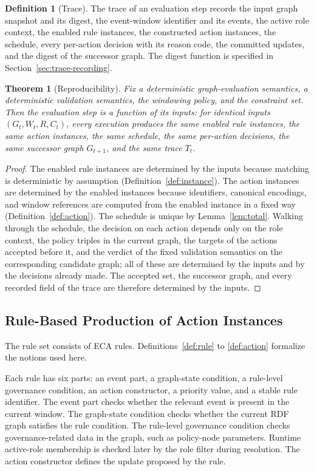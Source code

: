 \documentclass{ieeeaccess}
\theoremstyle{definition}
\newtheorem{definition}{Definition}
\theoremstyle{plain}
\newtheorem{theorem}{Theorem}
\theoremstyle{remark}
\begin{document}
\begin{definition}[Trace]
\label{def:trace}
The trace of an evaluation step records the input graph snapshot and its digest, the event-window identifier and its events, the active role context, the enabled rule instances, the constructed action instances, the schedule, every per-action decision with its reason code, the committed updates, and the digest of the successor graph. The digest function is specified in Section~\ref{sec:trace-recording}.
\end{definition}

\begin{theorem}[Reproducibility]
\label{thm:repro}
Fix a deterministic graph-evaluation semantics, a deterministic validation semantics, the windowing policy, and the constraint set. Then the evaluation step is a function of its inputs: for identical inputs $(G_t, W_t, R, C_t)$, every execution produces the same enabled rule instances, the same action instances, the same schedule, the same per-action decisions, the same successor graph $G_{t+1}$, and the same trace $T_t$.
\end{theorem}
\begin{proof}
The enabled rule instances are determined by the inputs because matching is deterministic by assumption (Definition~\ref{def:instance}). The action instances are determined by the enabled instances because identifiers, canonical encodings, and window references are computed from the enabled instance in a fixed way (Definition~\ref{def:action}). The schedule is unique by Lemma~\ref{lem:total}. Walking through the schedule, the decision on each action depends only on the role context, the policy triples in the current graph, the targets of the actions accepted before it, and the verdict of the fixed validation semantics on the corresponding candidate graph; all of these are determined by the inputs and by the decisions already made. The accepted set, the successor graph, and every recorded field of the trace are therefore determined by the inputs.
\end{proof}

\subsection{Rule-Based Production of Action Instances}

The rule set consists of ECA rules.
Definitions~\ref{def:rule} to \ref{def:action} formalize the notions used here.

Each rule has six parts: an event part, a graph-state condition, a rule-level governance condition, an action constructor, a priority value, and a stable rule identifier. The event part checks whether the relevant event is present in the current window. The graph-state condition checks whether the current RDF graph satisfies the rule condition. The rule-level governance condition checks governance-related data in the graph, such as policy-node parameters. Runtime active-role membership is checked later by the role filter during resolution. The action constructor defines the update proposed by the rule.
\end{document}
